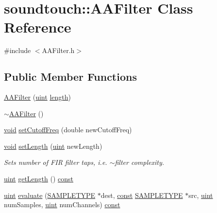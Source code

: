 \hypertarget{classsoundtouch_1_1_a_a_filter}{}\section{soundtouch\+:\+:A\+A\+Filter Class Reference}
\label{classsoundtouch_1_1_a_a_filter}


{\ttfamily \#include $<$A\+A\+Filter.\+h$>$}

\subsection*{Public Member Functions}
\begin{DoxyCompactItemize}
\item 
\hyperlink{classsoundtouch_1_1_a_a_filter_a2404e915e2c4f3b59b41711916ea45a5}{A\+A\+Filter} (\hyperlink{_s_t_types_8h_a91ad9478d81a7aaf2593e8d9c3d06a14}{uint} \hyperlink{classsoundtouch_1_1_a_a_filter_a3c0b7fabd5293ccf4f509f3654ea1b9e}{length})
\item 
\hyperlink{classsoundtouch_1_1_a_a_filter_aac11d52f6289497fb315bc1b67d6e20a}{$\sim$\+A\+A\+Filter} ()
\item 
\hyperlink{sound_8c_ae35f5844602719cf66324f4de2a658b3}{void} \hyperlink{classsoundtouch_1_1_a_a_filter_a83da9c8c2cea11eac1e25a10a958af82}{set\+Cutoff\+Freq} (double new\+Cutoff\+Freq)
\item 
\hyperlink{sound_8c_ae35f5844602719cf66324f4de2a658b3}{void} \hyperlink{classsoundtouch_1_1_a_a_filter_aa6ce96ac9e7daac8056e95b633c096b2}{set\+Length} (\hyperlink{_s_t_types_8h_a91ad9478d81a7aaf2593e8d9c3d06a14}{uint} new\+Length)
\begin{DoxyCompactList}\small\item\em Sets number of F\+IR filter taps, i.\+e. $\sim$filter complexity. \end{DoxyCompactList}\item 
\hyperlink{_s_t_types_8h_a91ad9478d81a7aaf2593e8d9c3d06a14}{uint} \hyperlink{classsoundtouch_1_1_a_a_filter_a2a65fd66829a85181c73443598b35054}{get\+Length} () \hyperlink{getopt1_8c_a2c212835823e3c54a8ab6d95c652660e}{const} 
\item 
\hyperlink{_s_t_types_8h_a91ad9478d81a7aaf2593e8d9c3d06a14}{uint} \hyperlink{classsoundtouch_1_1_a_a_filter_a7bf4cfd7a30cddd24b365c09ed7c9239}{evaluate} (\hyperlink{namespacesoundtouch_a97cfd29a7abb4d4b2a72f803d5b5850c}{S\+A\+M\+P\+L\+E\+T\+Y\+PE} $\ast$dest, \hyperlink{getopt1_8c_a2c212835823e3c54a8ab6d95c652660e}{const} \hyperlink{namespacesoundtouch_a97cfd29a7abb4d4b2a72f803d5b5850c}{S\+A\+M\+P\+L\+E\+T\+Y\+PE} $\ast$src, \hyperlink{_s_t_types_8h_a91ad9478d81a7aaf2593e8d9c3d06a14}{uint} num\+Samples, \hyperlink{_s_t_types_8h_a91ad9478d81a7aaf2593e8d9c3d06a14}{uint} num\+Channels) \hyperlink{getopt1_8c_a2c212835823e3c54a8ab6d95c652660e}{const} 
\end{DoxyCompactItemize}
